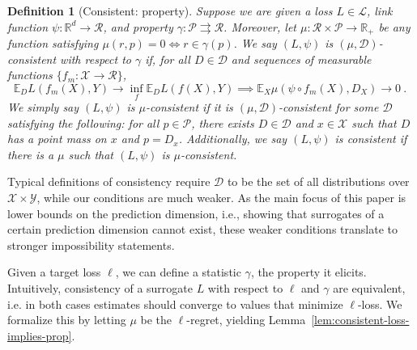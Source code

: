 \documentclass[11pt]{article} %
\newcommand{\reals}{\mathbb{R}}
\newcommand{\propdis}{\mu}
\newcommand{\D}{\mathcal{D}}
\newcommand{\E}{\mathbb{E}}
\renewcommand{\L}{\mathcal{L}}
\newcommand{\R}{\mathcal{R}}
\renewcommand{\P}{\mathcal{P}}
\newcommand{\X}{\mathcal{X}}
\newcommand{\Y}{\mathcal{Y}}
\newcommand{\toto}{\rightrightarrows}
\newtheorem{definition}{Definition}
\begin{document}
\begin{definition}[Consistent: property]\label{def:consistent-prop}
	Suppose we are given a loss $L \in \L$, link function $\psi: \reals^d \to \R$, and property $\gamma:\P \toto \R$.
	Moreover, let $\propdis : \R \times \P \to \reals_+$ be any function satisfying $\propdis(r,p) = 0 \iff r \in \gamma(p)$.
	We say $(L, \psi)$ is \emph{$(\propdis, \D)$-consistent with respect to} $\gamma$ if, for all $D \in \D$ and sequences of measurable functions $\{f_m: \X \to \R\}$, 
	\begin{equation}
	\E_{D} L(f_m(X), Y) \to \inf_f \E_{D} L( f(X), Y) \implies \E_X \propdis(\psi \circ f_m(X), D_X) \to 0~.~
	\end{equation}
	We simply say $(L,\psi)$ is \emph{$\propdis$-consistent} if it is $(\propdis,\D)$-consistent for some $\D$ satisfying the following: for all $p \in \P$, there exists $D \in \D$ and $x \in \X$ such that $D$ has a point mass on $x$ and $p = D_x$.
	Additionally, we say $(L,\psi)$ is \emph{consistent} if there is a $\propdis$ such that $(L,\psi)$ is $\propdis$-consistent.
\end{definition}

Typical definitions of consistency require $\D$ to be the set of all distributions over $\X \times \Y$, while our conditions are much weaker.
As the main focus of this paper is lower bounds on the prediction dimension, i.e., showing that surrogates of a certain prediction dimension cannot exist, these weaker conditions translate to stronger impossibility statements.



Given a target loss $\ell$, we can define a statistic $\gamma$, the property it elicits.
Intuitively, consistency of a surrogate $L$ with respect to $\ell$ and $\gamma$ are equivalent, i.e. in both cases estimates should converge to values that minimize $\ell$-loss.
We formalize this by letting $\propdis$ be the $\ell$-regret, yielding Lemma~\ref{lem:consistent-loss-implies-prop}.
\end{document}
